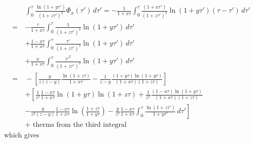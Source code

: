 \documentclass[11pt]{article}
\begin{document}
\begin{align}
    \quad& \int_0^{\tau} \frac{\ln(1+y\tau')}{(1+z\tau')^2} \Phi_x(\tau') \,d\tau' 
    = -\frac{1}{1+x\tau} \int_0^{\tau} \frac{(1+x\tau')}{(1+z\tau')^2} \ln(1+y\tau')(\tau-\tau') \,d\tau' \\\nonumber
    =& -\frac{\tau}{1+x\tau}\int_0^{\tau} \frac{1}{(1+z\tau')^2} \ln(1+y\tau')\,d\tau' \\\nonumber
    &+ \frac{1-x\tau}{1+x\tau}\int_0^{\tau} \frac{\tau'}{(1+z\tau')^2} \ln(1+y\tau')\,d\tau' \\\nonumber
    &+ \frac{x}{1+x\tau}\int_0^{\tau} \frac{\tau'^2}{(1+z\tau')^2} \ln(1+y\tau')\,d\tau' \\\nonumber
    =&{} -\left[\frac{y}{z(z-y)}\frac{\ln(1+z\tau)}{1+x\tau} - \frac{1}{z-y}\frac{(1+y\tau)\ln(1+y\tau)}{(1+x\tau)(1+z\tau)}\right] \\\nonumber
    &+ \left[\frac{1}{z^2}\frac{1-x\tau}{1+x\tau}\ln(1+y\tau)\ln(1+z\tau) + \frac{1}{z^2}\frac{(1-x\tau)\ln(1+y\tau)}{(1+x\tau)(1+z\tau)} \right. \\\nonumber
    &- \left. \frac{y}{z^2(z-y)}\frac{1-x\tau}{1+x\tau}\ln\left(\frac{1+z\tau}{1+y\tau}\right)-\frac{y}{z^2}\frac{1-x\tau}{1+x\tau}\int_0^{\tau}\frac{\ln(1+z\tau')}{1+y\tau'} \,d\tau' \right] \\\nonumber
    &+\textrm{ therms from the third integral}
\end{align}
which gives
\end{document}
